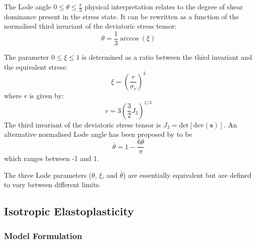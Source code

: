 \documentclass[sn-mathphys,Numbered,draft]{sn-jnl}%
\begin{document}
The Lode angle $0 \leq \theta \leq \frac{\pi}{3}$ physical interpretation relates to the degree of shear dominance present in the stress state.
It can be rewritten as a function of the normalised third invariant of the deviatoric stress tensor:
\begin{equation}
    \theta=\frac{1}{3} \arccos\left(\xi\right)
\end{equation}

The parameter $0 \leq \xi \leq 1$ is determined as a ratio between the third invariant and the equivalent stress:
\begin{equation}
	\xi = \left(\frac{r}{\sigma_{v}}\right)^3
\end{equation}
where $r$ is given by:
\begin{equation}
	r  = 3 \left(\frac{3}{2}J_3\right)^{1/3} %
\end{equation}
The third invariant of the deviatoric stress tensor is $J_3 = \text{det}[\text{dev}(\mathbf{s})]$.
An alternative normalised Lode angle has been proposed by \citet{bai_new_2008} to be
\begin{equation}
	\bar{\theta}=1-\frac{6\theta}{\pi}	
\end{equation}
which ranges between -1 and 1.

The three Lode parameters ($\theta$, $\xi$, and $\bar{\theta}$) are essentially equivalent but are defined to vary between different limits.


\subsection{Isotropic Elastoplasticity}


\subsubsection{Model Formulation}
\end{document}
